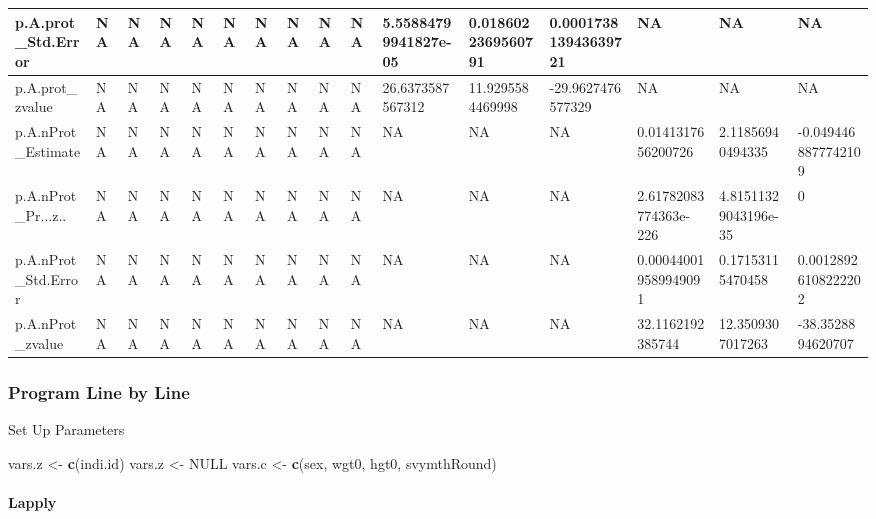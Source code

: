\documentclass[
]{book}
\newenvironment{Shaded}{\begin{snugshade}}{\end{snugshade}}
\newcommand{\KeywordTok}[1]{\textcolor[rgb]{0.13,0.29,0.53}{\textbf{#1}}}
\newcommand{\NormalTok}[1]{#1}
\newcommand{\OtherTok}[1]{\textcolor[rgb]{0.56,0.35,0.01}{#1}}
\newcommand{\StringTok}[1]{\textcolor[rgb]{0.31,0.60,0.02}{#1}}
\begin{document}
\begin{table}[!h]
{\begin{tabular}{l|l|l|l|l|l|l|l|l|l|l|l|l|l|l|l}
\hline
\rowcolor{gray!6}  p.A.prot\_Std.Error & NA & NA & NA & NA & NA & NA & NA & NA & NA & 5.55884799941827e-05 & 0.0186022369560791 & 0.000173813943639721 & NA & NA & NA\\
\hline
p.A.prot\_zvalue & NA & NA & NA & NA & NA & NA & NA & NA & NA & 26.6373587567312 & 11.9295584469998 & -29.9627476577329 & NA & NA & NA\\
\hline
\rowcolor{gray!6}  p.A.nProt\_Estimate & NA & NA & NA & NA & NA & NA & NA & NA & NA & NA & NA & NA & 0.0141317656200726 & 2.11856940494335 & -0.0494468877742109\\
\hline
p.A.nProt\_Pr...z.. & NA & NA & NA & NA & NA & NA & NA & NA & NA & NA & NA & NA & 2.61782083774363e-226 & 4.81511329043196e-35 & 0\\
\hline
\rowcolor{gray!6}  p.A.nProt\_Std.Error & NA & NA & NA & NA & NA & NA & NA & NA & NA & NA & NA & NA & 0.000440019589949091 & 0.17153115470458 & 0.00128926108222202\\
\hline
p.A.nProt\_zvalue & NA & NA & NA & NA & NA & NA & NA & NA & NA & NA & NA & NA & 32.1162192385744 & 12.3509307017263 & -38.3528894620707\\
\hline
\end{tabular}}
\end{table}

\hypertarget{program-line-by-line}{%
\subsubsection{Program Line by Line}\label{program-line-by-line}}

Set Up Parameters

\begin{Shaded}
\begin{Highlighting}[]
\NormalTok{vars.z \textless{}{-}}\StringTok{ }\KeywordTok{c}\NormalTok{(}\StringTok{\textquotesingle{}indi.id\textquotesingle{}}\NormalTok{)}
\NormalTok{vars.z \textless{}{-}}\StringTok{ }\OtherTok{NULL}
\NormalTok{vars.c \textless{}{-}}\StringTok{ }\KeywordTok{c}\NormalTok{(}\StringTok{\textquotesingle{}sex\textquotesingle{}}\NormalTok{, }\StringTok{\textquotesingle{}wgt0\textquotesingle{}}\NormalTok{, }\StringTok{\textquotesingle{}hgt0\textquotesingle{}}\NormalTok{, }\StringTok{\textquotesingle{}svymthRound\textquotesingle{}}\NormalTok{)}
\end{Highlighting}
\end{Shaded}

\hypertarget{lapply}{%
\paragraph{Lapply}\label{lapply}}
\end{document}
